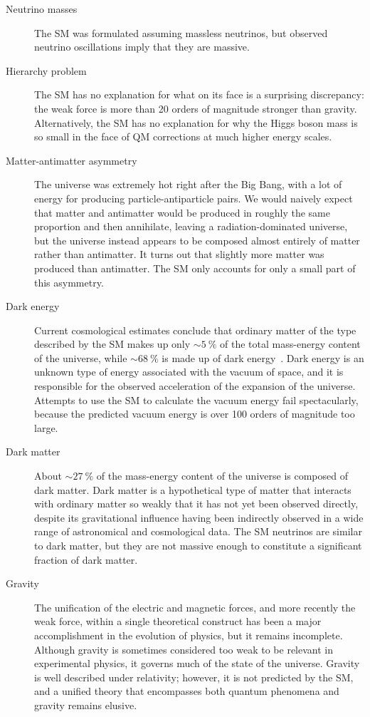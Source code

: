 \begin{description}
  \item[Neutrino masses] The SM was formulated assuming massless neutrinos, but observed neutrino oscillations imply that they are massive.
  \item[Hierarchy problem] The SM has no explanation for what on its face is a surprising discrepancy: the weak force is more than 20 orders of magnitude stronger than gravity. Alternatively, the SM has no explanation for why the Higgs boson mass is so small in the face of QM corrections at much higher energy scales.
  \item[Matter-antimatter asymmetry] The universe was extremely hot right after the Big Bang, with a lot of energy for producing particle-antiparticle pairs.  We would naively expect that matter and antimatter would be produced in roughly the same proportion and then annihilate, leaving a radiation-dominated universe, but the universe instead appears to be composed almost entirely of matter rather than antimatter. It turns out that slightly more matter was produced than antimatter. The SM only accounts for only a small part of this asymmetry.
  \item[Dark energy] Current cosmological estimates conclude that ordinary matter of the type described by the SM makes up only $\sim\SI{5}{\percent}$ of the total mass-energy content of the universe, while $\sim \SI{68}{\percent}$ is made up of dark energy~\cite{2014Plank}. Dark energy is an unknown type of energy associated with the vacuum of space, and it is responsible for the observed acceleration of the expansion of the universe. Attempts to use the SM to calculate the vacuum energy fail spectacularly, because the predicted vacuum energy is over 100 orders of magnitude too large.
  \item[Dark matter] About $\sim \SI{27}{\percent}$ of the mass-energy content of the universe is composed of dark matter. Dark matter is a hypothetical type of matter that interacts with ordinary matter so weakly that it has not yet been observed directly, despite its gravitational influence having been indirectly observed in a wide range of astronomical and cosmological data. The SM neutrinos are similar to dark matter, but they are not massive enough to constitute a significant fraction of dark matter.
  \item[Gravity] The unification of the electric and magnetic forces, and more recently the weak force, within a single theoretical construct has been a major accomplishment in the evolution of physics, but it remains incomplete. Although gravity is sometimes considered too weak to be relevant in experimental physics, it governs much of the state of the universe. Gravity is well described under relativity; however, it is not predicted by the SM, and a unified theory that encompasses both quantum phenomena and gravity remains elusive.
\end{description}

